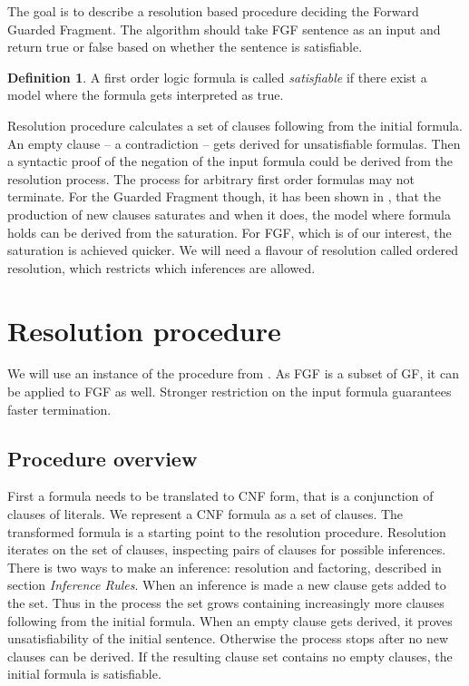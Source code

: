 \documentclass[english, shortabstract]{iithesis}
\theoremstyle{definition} \newtheorem{definition}{Definition}[chapter]
\theoremstyle{remark} \newtheorem{remark}[definition]{Observation}
\theoremstyle{plain} \newtheorem{theorem}[definition]{Theorem}
\theoremstyle{plain} \newtheorem{lemma}[definition]{Lemma}
\begin{document}
The goal is to describe a resolution based procedure deciding the Forward Guarded Fragment.
The algorithm should take FGF sentence as an input and return true or false based on whether the sentence is satisfiable.

\begin{definition}
A first order logic formula is called \emph{satisfiable} if there exist a model where the formula gets interpreted as true.
\end{definition}

Resolution procedure calculates a set of clauses following from the initial formula.
An empty clause -- a contradiction -- gets derived for unsatisfiable formulas. 
Then a syntactic proof of the negation of the input formula could be derived from the resolution process.
The process for arbitrary first order formulas may not terminate.
For the Guarded Fragment though, it has been shown in \cite{resolution GF}, that the production of new clauses saturates
and when it does, the model where formula holds can be derived from the saturation.
For FGF, which is of our interest, the saturation is achieved quicker.
We will need a flavour of resolution called ordered resolution, which restricts which inferences are allowed.

\chapter{Resolution procedure}

We will use an instance of the procedure from \cite{resolution gf}. 
As FGF is a subset of GF, it can be applied to FGF as well.
Stronger restriction on the input formula guarantees faster termination.

\section{Procedure overview}

First a formula needs to be translated to CNF form, that is a conjunction of clauses of literals. 
We represent a CNF formula as a set of clauses. The transformed formula is a starting point to the resolution procedure.
Resolution iterates on the set of clauses, inspecting pairs of clauses for possible inferences.
There is two ways to make an inference: resolution and factoring, described in section \textit{Inference Rules}.
When an inference is made a new clause gets added to the set.
Thus in the process the set grows containing increasingly more clauses following from the initial formula.
When an empty clause gets derived, it proves unsatisfiability of the initial sentence.
Otherwise the process stops after no new clauses can be derived. If the resulting 
clause set contains no empty clauses, the initial formula is satisfiable.
\end{document}
